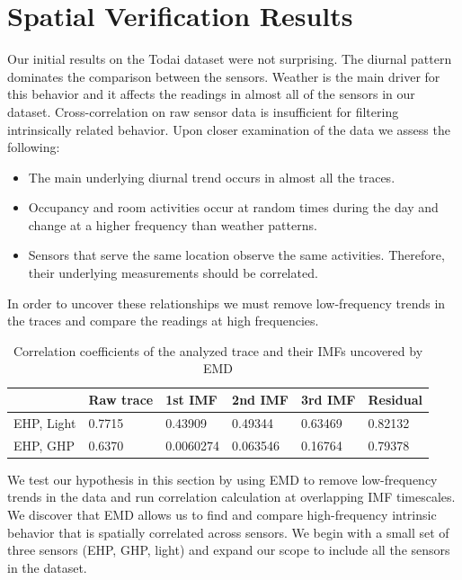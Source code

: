
\section{Spatial Verification Results}

Our initial results on the Todai dataset were not surprising.  The diurnal pattern dominates the comparison between the sensors.
Weather is the main driver for this behavior and it affects the readings in almost all of the
sensors in our dataset.  Cross-correlation on raw sensor data is insufficient for filtering intrinsically related
behavior.  Upon closer examination of the data we assess the following:

\begin{itemize}
\item The main underlying diurnal trend occurs in almost all the traces.
\item Occupancy and room activities occur at random times during the day and change 
		at a higher frequency than weather patterns.
\item Sensors that serve the same location observe the same activities.  Therefore, their underlying
		measurements should be correlated.
\end{itemize}

In order to uncover these relationships we must remove low-frequency trends in the traces and
compare the readings at high frequencies.

\begin{table}
\begin{center}
\begin{tabular}{|l|l|l|l|l|l|}
\hline
 & Raw trace & 1st IMF & 2nd IMF & 3rd IMF & Residual\\ \hline
EHP, Light & 0.7715 & 0.43909 & 0.49344 & 0.63469 & 0.82132 \\ \hline
EHP, GHP & 0.6370 & 0.0060274 & 0.063546 & 0.16764 & 0.79378 \\ \hline
\end{tabular}
\caption{Correlation coefficients of the analyzed trace and their IMFs uncovered by EMD}
\label{tab:corr}
\end{center}
\end{table}


We test our hypothesis in this section by using EMD to remove low-frequency trends in the data
and run correlation calculation at overlapping IMF timescales.  We discover that EMD allows us
to find and compare high-frequency intrinsic behavior that is spatially correlated across
sensors.  We begin with a small set of three sensors (EHP, GHP, light) and expand our scope
to include all the sensors in the dataset.







